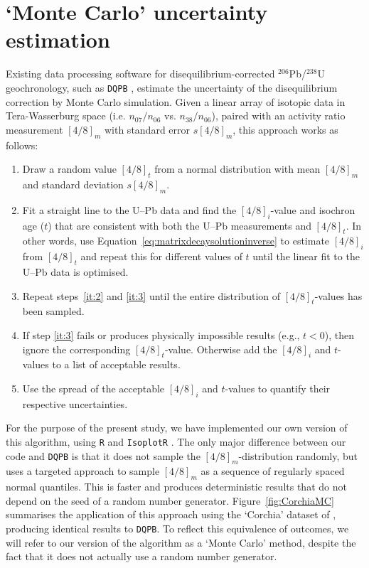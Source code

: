 \documentclass{article}
\begin{document}
\section{`Monte Carlo' uncertainty estimation}\label{sec:MC}

Existing data processing software for disequilibrium-corrected
${}^{206}$Pb/${}^{238}$U geo\-chro\-nology, such as \texttt{DQPB}
\citep{pollard2023}, estimate the uncertainty of the disequilibrium
correction by Monte Carlo simulation. Given a linear array of isotopic
data in Tera-Wasserburg space (i.e. $n_{07}/n_{06}$
vs. $n_{38}/n_{06}$), paired with an activity ratio measurement
$[4/8]_m$ with standard error $s[4/8]_m$, this approach works as
follows:

\begin{enumerate}
\item\label{it:2} Draw a random value $[4/8]_t$ from a normal
  distribution with mean $[4/8]_m$ and standard deviation
  $s[4/8]_m$.
\item\label{it:3} Fit a straight line to the U--Pb data and find the
  $[4/8]_i$-value and isochron age ($t$) that are consistent with
  both the U--Pb measurements and $[4/8]_t$. In other words, use
  Equation~\ref{eq:matrixdecaysolutioninverse} to estimate $[4/8]_i$
  from $[4/8]_t$ and repeat this for different values of $t$ until
  the linear fit to the U--Pb data is optimised.
\item Repeat steps~\ref{it:2} and \ref{it:3} until the entire
  distribution of $[4/8]_t$-values has been sampled.
\item If step \ref{it:3} fails or produces physically impossible
  results (e.g., $t<0$), then ignore the corresponding
  $[4/8]_t$-value. Otherwise add the $[4/8]_i$ and $t$-values to a
  list of acceptable results.\label{it:4}
\item Use the spread of the acceptable $[4/8]_i$ and $t$-values to
  quantify their respective uncertainties.
\end{enumerate}

For the purpose of the present study, we have implemented our own
version of this algorithm, using \texttt{R} and \texttt{IsoplotR}
\citep{vermeesch2018c}.  The only major difference between our code
and \texttt{DQPB} is that it does not sample the
$[4/8]_m$-distribution randomly, but uses a targeted approach to
sample $[4/8]_m$ as a sequence of regularly spaced normal
quantiles. This is faster and produces deterministic results that do
not depend on the seed of a random number
generator. Figure~\ref{fig:CorchiaMC} summarises the application of
this approach using the `Corchia' dataset of \citet{pollard2023},
producing identical results to \texttt{DQPB}. To reflect this
equivalence of outcomes, we will refer to our version of the algorithm
as a `Monte Carlo' method, despite the fact that it does not actually
use a random number generator.\medskip
\end{document}
